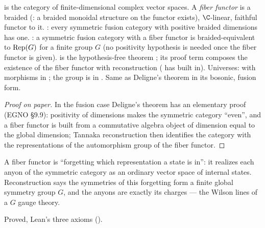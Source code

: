 \begin{dictionary}
 is the category of finite-dimensional complex vector spaces. A \emph{fiber functor}  is a
braided (: a braided monoidal structure on the functor exists), $\C$-linear, faithful functor
to it. : every symmetric fusion category with positive braided dimensions has one.
: a symmetric fusion category with a fiber functor is braided-equivalent to
$\operatorname{Rep}(G)$ for a finite group $G$ (no positivity hypothesis is needed once the fiber functor is given).
 is the hypothesis-free theorem ; its proof term composes the
existence of the fiber functor with reconstruction ( has
 built in). Universes:  with morphisms in ; the group
 is in . Same as Deligne's theorem in its bosonic, fusion form.
\end{dictionary}

\begin{proof}[Proof on paper]
In the fusion case Deligne's theorem has an elementary proof (EGNO §9.9): positivity of dimensions makes the symmetric
category ``even'', and a fiber functor is built from a commutative algebra object of dimension equal to the global
dimension; Tannaka reconstruction then identifies the category with the representations of the automorphism group of the
fiber functor.
\end{proof}

\begin{physics}
A fiber functor is ``forgetting which representation a state is in'': it realizes each anyon of the symmetric category as
an ordinary vector space of internal states. Reconstruction says the symmetries of this forgetting form a finite global
symmetry group $G$, and the anyons are exactly its charges --- the Wilson lines of a $G$ gauge theory.
\end{physics}

\begin{status}
Proved, Lean's three axioms ().
\end{status}

